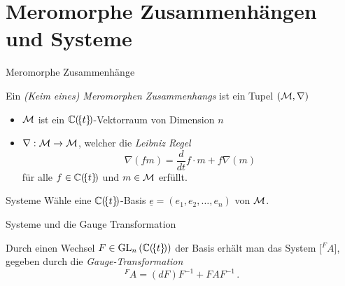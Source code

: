 \section{Meromorphe Zusammenhängen und Systeme}
\begin{frame}{Meromorphe Zusammenhänge}
  \begin{defn}
    Ein \emph{(Keim eines) Meromorphen Zusammenhangs} ist ein Tupel
    $(\mathcal{M},\nabla)$
    \begin{itemize}
    \item<2-> $\mathcal{M}$ ist ein $\mathbb{C}(\!\{t\}\!)$-Vektorraum von Dimension $n$
    \item<3-> $\nabla:\mathcal{M}\to \mathcal{M}$, welcher die \emph{Leibniz Regel}
      \[
        \nabla(fm)=\frac{d}{dt} f \cdot m + f \nabla(m)
      \]
      für alle $f\in\mathbb{C}(\!\{t\}\!)$ und $m\in\mathcal{M}$ erfüllt.
    \end{itemize}
  \end{defn}
\end{frame}
\begin{frame}{Systeme}
  Wähle eine $\mathbb{C}(\!\{t\}\!)$-Basis $\underline{e}=(e_1,e_2,\dots,e_n)$ von
  $\mathcal{M}$.
\end{frame}
\begin{frame}{Systeme und die Gauge Transformation}
  \begin{prop}
    Durch einen Wechsel $F\in\operatorname{GL}_n\left(\mathbb{C}(\!\{t\}\!)\right)$ der Basis erhält
    man
    das System $\bigl[{}^F\!A\bigr]$, gegeben durch die
    \emph{Gauge-Transformation}
    \[
      {}^F\!A=(dF)F^{-1} + FAF^{-1} \,.
    \]
  \end{prop}
\end{frame}

